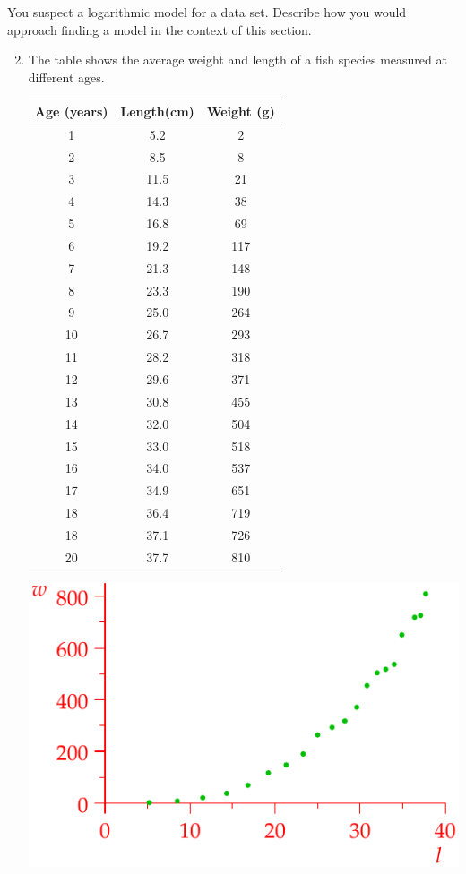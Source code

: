 \begin{exercises}{}{}
\exstart You suspect a logarithmic model for a data set. Describe how you would approach finding a model in the context of this section.


\begin{enumerate}\setcounter{enumi}{1}
  \item The table shows the average weight and length of a fish species measured at different ages.\par
	\begin{minipage}[t]{0.45\linewidth}\vspace{0pt}
	\centering\begin{tabular}{c|c|c}
	Age (years)&Length(cm)& Weight (g)\\\hline\hline
	1 & 5.2 & 2\\
	2 & 8.5 & 8\\
	3 & 11.5 & 21\\
	4 & 14.3 & 38\\
	5 & 16.8 & 69\\
	6 & 19.2 & 117\\
	7 & 21.3 & 148\\
	8 & 23.3 & 190\\
	9 & 25.0 & 264\\
	10 & 26.7 & 293\\
	11 & 28.2 & 318\\
	12 & 29.6 & 371\\
	13 & 30.8 & 455\\
	14 & 32.0 & 504\\
	15 & 33.0 & 518\\
	16 & 34.0 & 537\\
	17 & 34.9 & 651\\
	18 & 36.4 & 719\\
	18 & 37.1 & 726\\
	20 & 37.7 & 810
	\end{tabular}
	\end{minipage}
	\hfill
	\begin{minipage}[t]{0.54\linewidth}\vspace{0pt}
	\hfill\includegraphics[scale=0.95]{fishexp}

\end{minipage}
\end{enumerate}
\end{exercises}
